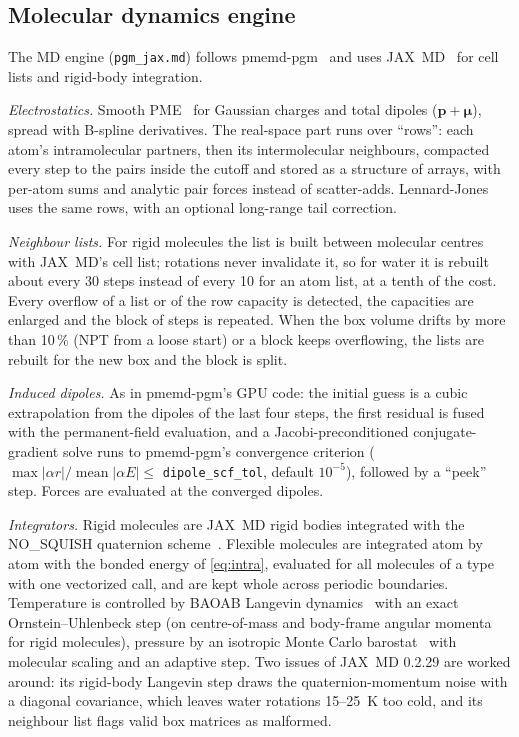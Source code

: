 \documentclass[11pt]{article}
\newcommand{\code}[1]{\texttt{#1}}
\begin{document}
\subsection{Molecular dynamics engine}\label{sec:md}
The MD engine (\code{pgm\_jax.md}) follows pmemd-pgm~\cite{wei2020pgm,wei2022pgmstress,huang2025pgmtuning}
and uses JAX~MD~\cite{schoenholz2020jaxmd} for cell lists and rigid-body integration.

\emph{Electrostatics.} Smooth PME~\cite{essmann1995spme} for Gaussian charges and total dipoles
($\bm p+\bm\mu$), spread with B-spline derivatives. The real-space part runs over ``rows'': each
atom's intramolecular partners, then its intermolecular neighbours, compacted every step to the
pairs inside the cutoff and stored as a structure of arrays, with per-atom sums and analytic pair
forces instead of scatter-adds. Lennard-Jones uses the same rows, with an optional long-range
tail correction.

\emph{Neighbour lists.} For rigid molecules the list is built between molecular centres with
JAX~MD's cell list; rotations never invalidate it, so for water it is rebuilt about every 30 steps
instead of every 10 for an atom list, at a tenth of the cost. Every overflow of a list or of the
row capacity is detected, the capacities are enlarged and the block of steps is repeated. When the
box volume drifts by more than 10\,\% (NPT from a loose start) or a block keeps overflowing, the
lists are rebuilt for the new box and the block is split.

\emph{Induced dipoles.} As in pmemd-pgm's GPU code: the initial guess is a cubic extrapolation from
the dipoles of the last four steps, the first residual is fused with the permanent-field
evaluation, and a Jacobi-preconditioned conjugate-gradient solve runs to pmemd-pgm's convergence
criterion ($\max|\alpha r|/\operatorname{mean}|\alpha E|\le$ \code{dipole\_scf\_tol}, default
$10^{-5}$), followed by a ``peek'' step. Forces are evaluated at the converged dipoles.

\emph{Integrators.} Rigid molecules are JAX~MD rigid bodies integrated with the NO\_SQUISH
quaternion scheme~\cite{miller2002nosquish}. Flexible molecules are integrated atom by atom with the
bonded energy of \cref{eq:intra}, evaluated for all molecules of a type with one vectorized call,
and are kept whole across periodic boundaries. Temperature is controlled by BAOAB Langevin
dynamics~\cite{leimkuhler2013baoab} with an exact Ornstein--Uhlenbeck step (on centre-of-mass and
body-frame angular momenta for rigid molecules), pressure by an isotropic Monte Carlo
barostat~\cite{chow1995mcbarostat,aqvist2004mcbarostat} with molecular scaling and an adaptive
step. Two issues of JAX~MD 0.2.29 are worked around: its rigid-body Langevin step draws the
quaternion-momentum noise with a diagonal covariance, which leaves water rotations 15--25~K too
cold, and its neighbour list flags valid box matrices as malformed.
\end{document}
